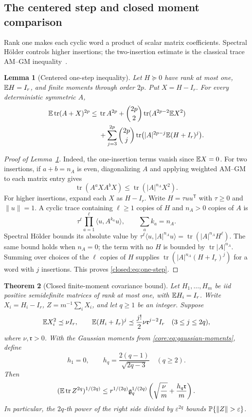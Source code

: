 \documentclass[11pt,a4paper]{article}
\newtheorem{theorem}{Theorem}[section]
\newtheorem{lemma}[theorem]{Lemma}
\theoremstyle{definition}\newtheorem{definition}[theorem]{Definition}
\theoremstyle{remark}\newtheorem{remark}[theorem]{Remark}
\numberwithin{equation}{section}
\newcommand{\gmom}{\mathfrak g}
\newcommand{\Rmom}{\mathfrak r}
\DeclareMathOperator{\tr}{tr}\DeclareMathOperator{\rank}{rank}
\begin{document}
\subsection{The centered step and closed moment comparison}\label{appendix:closed}
Rank one makes each cyclic word a product of scalar matrix coefficients.
Spectral H\"older controls higher insertions; the two-insertion estimate
is the classical trace AM--GM inequality~\cite{TroppElementary}.
\begin{lemma}[Centered one-step inequality]\label{closed:lem:step}
Let $H\succeq0$ have rank at most one, $\mathbb E H=I_r$, and finite moments
through order $2p$. Put $X=H-I_r$. For every deterministic symmetric $A$,
\begin{align}\label{closed:eq:one-step}
 \E\tr(A+X)^{2p}\le{}&\tr A^{2p}
 +\binom{2p}{2}\tr(A^{2p-2}\E X^2)\nonumber\\
 &+\sum_{j=3}^{2p}\binom{2p}{j}
 \tr\bigl(|A|^{2p-j}\E(H+I_r)^j\bigr).
\end{align}
\end{lemma}
\begin{proof}[Proof of Lemma~\ref{closed:lem:step}]
Indeed, the one-insertion terms vanish since $\mathbb E X=0$. For two
insertions, if $a+b={n_A}$ is even, diagonalizing $A$ and applying weighted
AM--GM to each matrix entry gives
\[
 \tr(A^aXA^bX)\le\tr(|A|^{n_A}X^2).
\]
For higher insertions, expand each $X$ as $H-I_r$. Write
$H=\tau uu^{\mathsf T}$ with $\tau\ge0$ and $\|u\|=1$.
A cyclic trace containing $\ell\ge1$ copies of $H$ and ${n_A}>0$
copies of $A$ is
\[
 \tau^\ell\prod_{a=1}^{\ell}\langle u,A^{k_a}u\rangle,
 \qquad\sum_a k_a={n_A}.
\]
Spectral H\"older bounds its absolute value by
$\tau^\ell\langle u,|A|^{n_A}u\rangle
=\tr(|A|^{n_A}H^\ell)$. The same bound holds when ${n_A}=0$;
the term with no $H$ is bounded by $\tr|A|^{n_A}$.
Summing over choices of the $\ell$ copies of $H$ supplies
$\tr(|A|^{n_A}(H+I_r)^j)$ for a word with $j$ insertions.
This proves \eqref{closed:eq:one-step}.
\end{proof}

\begin{theorem}[Closed finite-moment covariance bound]\label{closed:thm:moment}
Let $H_1,\ldots,H_m$ be iid positive semidefinite matrices of rank
at most one, with $\mathbb E H_i=I_r$. Write $X_i=H_i-I_r$,
$Z=m^{-1}\sum_iX_i$, and let $q\ge1$ be an integer. Suppose
\[
 \E X_i^2\preceq\nu I_r,\qquad
 \E(H_i+I_r)^j\preceq\frac{j!}{2}\nu\Rmom^{j-2}I_r
 \quad(3\le j\le2q),
\]
where $\nu,\Rmom>0$. With the Gaussian moments from
\eqref{core:eq:gaussian-moments}, define
\[
 h_1=0,\qquad h_q=\frac{2(q-1)}{\sqrt{2q-3}}\quad(q\ge2).
\]
Then
\begin{equation}\label{closed:eq:bound}
 (\E\tr Z^{2q})^{1/(2q)}
 \le r^{1/(2q)}\gmom_q^{1/(2q)}
 \left(\sqrt{\frac\nu m}+\frac{h_q\Rmom}{m}\right).
\end{equation}
In particular, the $2q$-th power of the right side divided by
$\varepsilon^{2q}$ bounds $\Pp\{\|Z\|>\varepsilon\}$.
\end{theorem}
\end{document}
